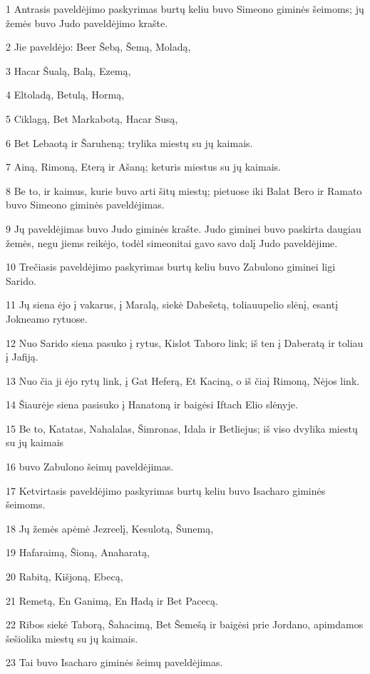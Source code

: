 \par 1 Antrasis paveldėjimo paskyrimas burtų keliu buvo Simeono giminės šeimoms; jų žemės buvo Judo paveldėjimo krašte. 
\par 2 Jie paveldėjo: Beer Šebą, Šemą, Moladą, 
\par 3 Hacar Šualą, Balą, Ezemą, 
\par 4 Eltoladą, Betulą, Hormą, 
\par 5 Ciklagą, Bet Markabotą, Hacar Susą, 
\par 6 Bet Lebaotą ir Šaruheną; trylika miestų su jų kaimais. 
\par 7 Ainą, Rimoną, Eterą ir Ašaną; keturis miestus su jų kaimais. 
\par 8 Be to, ir kaimus, kurie buvo arti šitų miestų; pietuose iki Balat Bero ir Ramato buvo Simeono giminės paveldėjimas. 
\par 9 Jų paveldėjimas buvo Judo giminės krašte. Judo giminei buvo paskirta daugiau žemės, negu jiems reikėjo, todėl simeonitai gavo savo dalį Judo paveldėjime. 
\par 10 Trečiasis paveldėjimo paskyrimas burtų keliu buvo Zabulono giminei ligi Sarido. 
\par 11 Jų siena ėjo į vakarus, į Maralą, siekė Dabešetą, toliau­upelio slėnį, esantį Jokneamo rytuose. 
\par 12 Nuo Sarido siena pasuko į rytus, Kislot Taboro link; iš ten į Daberatą ir toliau į Jafiją. 
\par 13 Nuo čia ji ėjo rytų link, į Gat Heferą, Et Kaciną, o iš čia­į Rimoną, Nėjos link. 
\par 14 Šiaurėje siena pasisuko į Hanatoną ir baigėsi Iftach Elio slėnyje. 
\par 15 Be to, Katatas, Nahalalas, Šimronas, Idala ir Betliejus; iš viso dvylika miestų su jų kaimais 
\par 16 buvo Zabulono šeimų paveldėjimas. 
\par 17 Ketvirtasis paveldėjimo paskyrimas burtų keliu buvo Isacharo giminės šeimoms. 
\par 18 Jų žemės apėmė Jezreelį, Kesulotą, Šunemą, 
\par 19 Hafaraimą, Šioną, Anaharatą, 
\par 20 Rabitą, Kišjoną, Ebecą, 
\par 21 Remetą, En Ganimą, En Hadą ir Bet Pacecą. 
\par 22 Ribos siekė Taborą, Šahacimą, Bet Šemešą ir baigėsi prie Jordano, apimdamos šešiolika miestų su jų kaimais. 
\par 23 Tai buvo Isacharo giminės šeimų paveldėjimas. 
